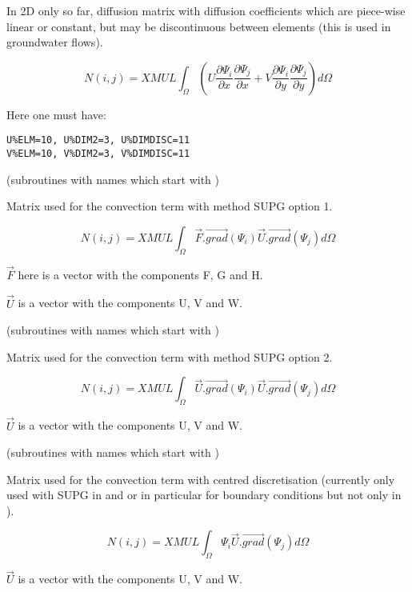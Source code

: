 
In 2D only so far, diffusion matrix with diffusion coefficients which are
piece-wise linear or constant, but may be discontinuous between elements (this
is used in groundwater flows).

\[
N(i,j)=XMUL\int _{\Omega }
(U\frac{\partial \Psi _{i} }{\partial x}
  \frac{\partial \Psi _{j} }{\partial x}
+V\frac{\partial \Psi _{i} }{\partial y}
  \frac{\partial \Psi _{j} }{\partial y} )d\Omega
\]

Here one must have:
\begin{lstlisting}[language=TelFortran]
U%ELM=10, U%DIM2=3, U%DIMDISC=11
V%ELM=10, V%DIM2=3, V%DIMDISC=11
\end{lstlisting}


(subroutines with names which start with )

Matrix used for the convection term with method SUPG option 1.

\[N(i,j)=XMUL
\int _{\Omega }
\vec{F} . \overrightarrow{grad} (\Psi _{i} )
\vec{U} . \overrightarrow{grad} (\Psi _{j} )
d\Omega
\]

$\vec{F}$ here is a vector with the components F, G and H.

$\vec{U}$ is a vector with the components U, V and W.


(subroutines with names which start with )

Matrix used for the convection term with method SUPG option 2.

\[N(i,j)=XMUL
\int _{\Omega }
\vec{U} . \overrightarrow{grad} (\Psi _{i} )
\vec{U} . \overrightarrow{grad} (\Psi _{j} )
d\Omega
\]

$\vec{U}$ is a vector with the components U, V and W.


(subroutines with names which start with )

Matrix used for the convection term with centred discretisation
(currently only used with SUPG in  and 
or in particular for boundary conditions but not only in \artemis).

\[
N(i,j)=XMUL \int _{\Omega }
\Psi _{i} \vec{U} . \overrightarrow{grad} (\Psi _{j} )
d\Omega
\]

$\vec{U}$ is a vector with the components U, V and W.

